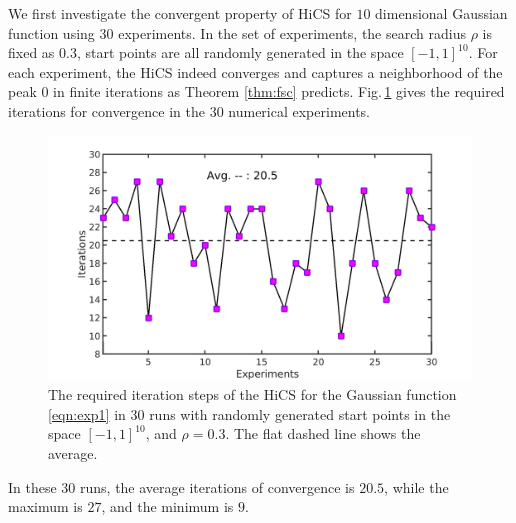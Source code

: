 \documentclass[mathpazo]{csam}
\theoremstyle{remark}
\begin{document}
We first investigate the convergent property of HiCS
for $10$ dimensional Gaussian function using 
$30$ experiments.
In the set of experiments, the search radius $\rho$ is fixed as
$0.3$, start points are all randomly generated in the space $[-1,
1]^{10}$.  For each experiment, the HiCS indeed converges and
captures a neighborhood of the peak
$0$ in finite iterations as Theorem \ref{thm:fsc} predicts.
Fig.\,\ref{fig:exp1:randInit} gives the required iterations for
convergence in the $30$ numerical experiments.
\begin{figure}[!htbp]
	\centering
	  \includegraphics[scale=0.2]{../figures/gauss10Drandr0_3.png}
	  \caption{
	  The required iteration steps of the 
	  HiCS for the Gaussian function
	  \eqref{eqn:exp1} in $30$ runs with randomly generated start points
	  in the space $[-1, 1]^{10}$, and $\rho=0.3$. 
	  The flat dashed line shows the average.} 
	  \label{fig:exp1:randInit}
\end{figure}
In these $30$ runs, the average iterations of convergence is
$20.5$, while the maximum is $27$, and the minimum is $9$.
\end{document}
